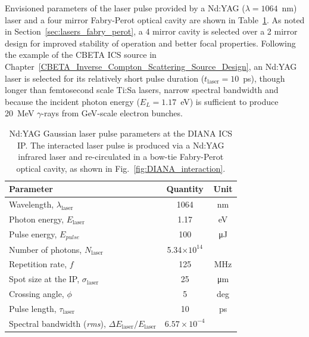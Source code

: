 \documentclass[../main.tex]{subfiles}
\begin{document}
Envisioned parameters of the laser pulse provided by a Nd:YAG ($\lambda = 1064$~\si{\nano\meter}) laser and a four mirror Fabry-Perot optical cavity are shown in Table~\ref{tab:DIANA_laser_pulse_design_parameters}. As noted in Section~\ref{sec:lasers_fabry_perot}, a 4 mirror cavity is selected over a 2 mirror design for improved stability of operation and better focal properties. Following the example of the CBETA ICS source in Chapter~\ref{CBETA_Inverse_Compton_Scattering_Source_Design}, an Nd:YAG laser is selected for its relatively short pulse duration ($t_{\mathrm{laser}}=10$~\si{\pico\second}), though longer than femtosecond scale Ti:Sa lasers, narrow spectral bandwidth and because the incident photon energy ($E_{L}=1.17$~\si{\electronvolt}) is sufficient to produce 20~\si{\mega\electronvolt} $\gamma$-rays from \si{\giga\electronvolt}-scale electron bunches. 
\begin{table}[!h]
\centering
\caption{Nd:YAG Gaussian laser pulse parameters at the DIANA ICS IP. The interacted laser pulse is produced via a Nd:YAG infrared laser and re-circulated in a bow-tie Fabry-Perot optical cavity, as shown in Fig.~\ref{fig:DIANA_interaction}.}
\vspace{3mm}
\begin{tabular}{lcc}
\hline\hline
Parameter & Quantity & Unit \\
\hline
Wavelength, $\lambda_\textrm{laser}$ & 1064 & \si{\nano\meter}\\
Photon energy, $E_\textrm{laser}$ & 1.17 & \si{\electronvolt}\\
Pulse energy, $E_{pulse}$  & 100 & \si{\micro\joule}\\
Number of photons, $N_{\textrm{laser}}$ & 5.34$\times 10^{14}$ & \\ 
Repetition rate, $f$ & 125 & \si{\mega\hertz}\\
Spot size at the IP, $\sigma_\textrm{laser}$ & 25 & \si{\micro\meter}\\
Crossing angle, $\phi$ & 5 & deg \\
Pulse length, $\tau_{\mathrm{laser}}$  & 10 & \si{\pico\second}\\
Spectral bandwidth (\textit{rms}), $\Delta E_\textrm{laser}/E_\textrm{laser}$ & $6.57\times 10^{-4}$ &   \\
\hline\hline
\end{tabular}
\label{tab:DIANA_laser_pulse_design_parameters}
\end{table}
\end{document}
